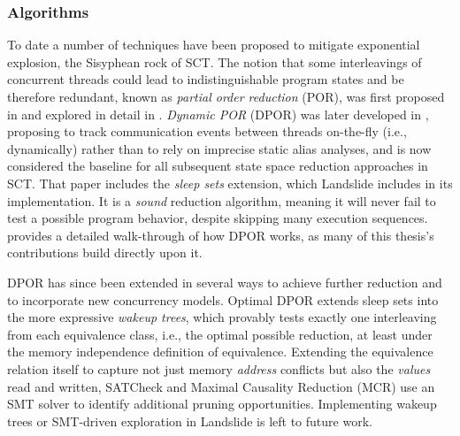 \subsubsection{Algorithms}

To date a number of techniques have been proposed to mitigate exponential explosion,
the Sisyphean rock of SCT.
The notion that some interleavings of concurrent threads could lead to indistinguishable program states and be therefore redundant,
known as {\em partial order reduction} (POR),
was first proposed in \cite{partial-model-checking}
and explored in detail in \cite{partial-order-methods}.
{\em Dynamic POR} (DPOR) was later developed in \cite{dpor},
proposing to track communication events between threads on-the-fly (i.e., dynamically)
rather than to rely on imprecise static alias analyses,
and is now considered the baseline for all subsequent state space reduction approaches in SCT.
That paper includes the {\em sleep sets} extension,
which Landslide includes in its implementation.
It is a {\em sound} reduction algorithm, meaning it will never fail to test a possible program behavior, despite skipping many execution sequences.
\sect{\ref{sec:landslide-dpor}} provides a detailed walk-through of how DPOR works,
as many of this thesis's contributions build directly upon it.

DPOR has since been extended in several ways to achieve further reduction
and to incorporate new concurrency models.
Optimal DPOR \cite{optimal-dpor} extends sleep sets into the more expressive {\em wakeup trees},
which provably tests exactly one interleaving from each equivalence class,
i.e., the optimal possible reduction,
at least under the memory independence definition of equivalence.
Extending the equivalence relation itself to capture not just memory {\em address} conflicts
but also the {\em values} read and written,
SATCheck \cite{satcheck} and Maximal Causality Reduction (MCR) \cite{mcr}
use an SMT solver \cite{z3} to identify additional pruning opportunities.
Implementing wakeup trees or SMT-driven exploration in Landslide is left to future work.

